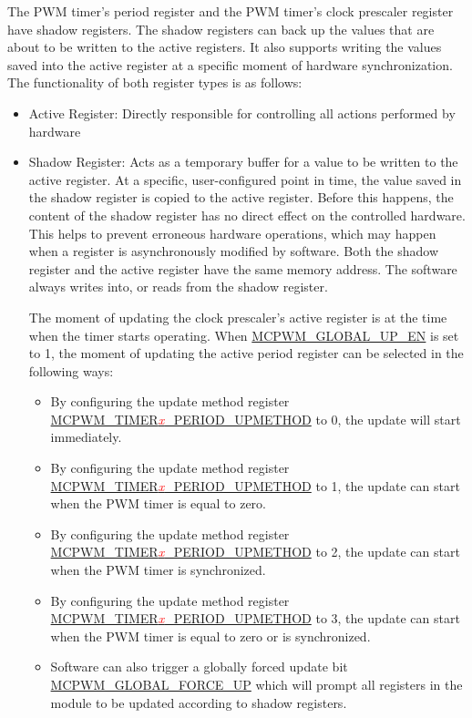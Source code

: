 \documentclass[main\_\_EN.tex]{subfiles}
\begin{document}
The PWM timer's period register and the PWM timer's clock prescaler register have shadow registers. The shadow registers can back up the values that are about to be written to the active registers. It also supports writing the values saved into the active register at a specific moment of hardware synchronization. The functionality of both register types is as follows:
\begin{itemize}
    \item Active Register: Directly responsible for controlling all actions performed by hardware
    \item Shadow Register: Acts as a temporary buffer for a value to be written to the active register. At a specific, user-configured point in time, the value saved in the shadow register is copied to the active register. Before this happens, the content of the shadow register has no direct effect on the controlled hardware. This helps to prevent erroneous hardware operations, which may happen when a register is asynchronously modified by software. Both the shadow register and the active register have the same memory address. The software always writes into, or reads from the shadow register. 
    
    The moment of updating the clock prescaler's active register is at the time when the timer starts operating. When \hyperref[fielddesc:MCPWMGLOBALUPEN]{MCPWM\_GLOBAL\_UP\_EN} is set to 1, the moment of updating the active period register can be selected in the following ways:
    
    \begin{itemize}
    \item By configuring the update method register \hyperref[fielddesc:MCPWMTIMER0PERIODUPMETHOD]{MCPWM\_TIMER\textcolor{red}{\it{x}}\_PERIOD\_UPMETHOD} to 0, the update will start immediately.
    \item By configuring the update method register \hyperref[fielddesc:MCPWMTIMER0PERIODUPMETHOD]{MCPWM\_TIMER\textcolor{red}{\it{x}}\_PERIOD\_UPMETHOD} to 1, the update can start when the PWM timer is equal to zero.
    \item By configuring the update method register \hyperref[fielddesc:MCPWMTIMER0PERIODUPMETHOD]{MCPWM\_TIMER\textcolor{red}{\it{x}}\_PERIOD\_UPMETHOD} to 2, the update can start when the PWM timer is synchronized.
    \item By configuring the update method register \hyperref[fielddesc:MCPWMTIMER0PERIODUPMETHOD]{MCPWM\_TIMER\textcolor{red}{\it{x}}\_PERIOD\_UPMETHOD} to 3, the update can start when the PWM timer is equal to zero or is synchronized.
    \item Software can also trigger a globally forced update bit\\ \hyperref[fielddesc:MCPWMGLOBALFORCEUP]{MCPWM\_GLOBAL\_FORCE\_UP} which will prompt all registers in the module to be updated according to shadow registers.
    \end{itemize}
\end{itemize}
\end{document}
